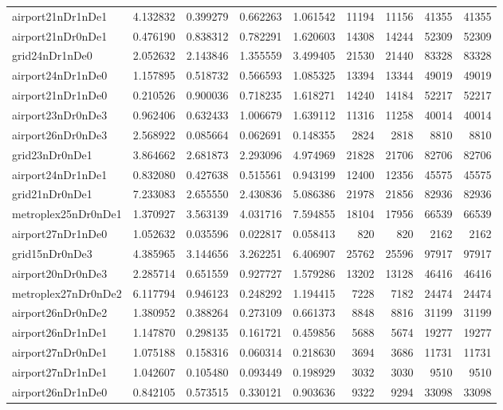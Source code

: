 \begin{longtable}{|l|r|r|r|r|r|r|r|r|}
airport21nDr1nDe1 & 4.132832 & 0.399279 & 0.662263 & 1.061542 & 11194 & 11156 & 41355 & 41355 \\
airport21nDr0nDe1 & 0.476190 & 0.838312 & 0.782291 & 1.620603 & 14308 & 14244 & 52309 & 52309 \\
grid24nDr1nDe0 & 2.052632 & 2.143846 & 1.355559 & 3.499405 & 21530 & 21440 & 83328 & 83328 \\
airport24nDr1nDe0 & 1.157895 & 0.518732 & 0.566593 & 1.085325 & 13394 & 13344 & 49019 & 49019 \\
airport21nDr1nDe0 & 0.210526 & 0.900036 & 0.718235 & 1.618271 & 14240 & 14184 & 52217 & 52217 \\
airport23nDr0nDe3 & 0.962406 & 0.632433 & 1.006679 & 1.639112 & 11316 & 11258 & 40014 & 40014 \\
airport26nDr0nDe3 & 2.568922 & 0.085664 & 0.062691 & 0.148355 & 2824 & 2818 & 8810 & 8810 \\
grid23nDr0nDe1 & 3.864662 & 2.681873 & 2.293096 & 4.974969 & 21828 & 21706 & 82706 & 82706 \\
airport24nDr1nDe1 & 0.832080 & 0.427638 & 0.515561 & 0.943199 & 12400 & 12356 & 45575 & 45575 \\
grid21nDr0nDe1 & 7.233083 & 2.655550 & 2.430836 & 5.086386 & 21978 & 21856 & 82936 & 82936 \\
metroplex25nDr0nDe1 & 1.370927 & 3.563139 & 4.031716 & 7.594855 & 18104 & 17956 & 66539 & 66539 \\
airport27nDr1nDe0 & 1.052632 & 0.035596 & 0.022817 & 0.058413 & 820 & 820 & 2162 & 2162 \\
grid15nDr0nDe3 & 4.385965 & 3.144656 & 3.262251 & 6.406907 & 25762 & 25596 & 97917 & 97917 \\
airport20nDr0nDe3 & 2.285714 & 0.651559 & 0.927727 & 1.579286 & 13202 & 13128 & 46416 & 46416 \\
metroplex27nDr0nDe2 & 6.117794 & 0.946123 & 0.248292 & 1.194415 & 7228 & 7182 & 24474 & 24474 \\
airport26nDr0nDe2 & 1.380952 & 0.388264 & 0.273109 & 0.661373 & 8848 & 8816 & 31199 & 31199 \\
airport26nDr1nDe1 & 1.147870 & 0.298135 & 0.161721 & 0.459856 & 5688 & 5674 & 19277 & 19277 \\
airport27nDr0nDe1 & 1.075188 & 0.158316 & 0.060314 & 0.218630 & 3694 & 3686 & 11731 & 11731 \\
airport27nDr1nDe1 & 1.042607 & 0.105480 & 0.093449 & 0.198929 & 3032 & 3030 & 9510 & 9510 \\
airport26nDr1nDe0 & 0.842105 & 0.573515 & 0.330121 & 0.903636 & 9322 & 9294 & 33098 & 33098 \\

\end{longtable}
